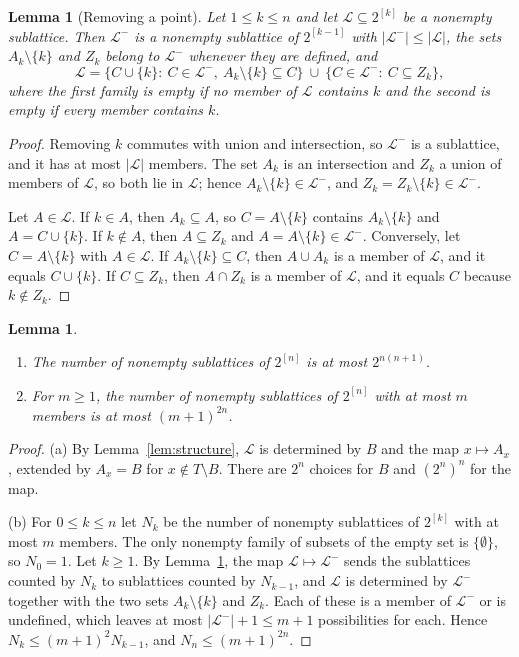 \documentclass[11pt,reqno]{amsart}
\numberwithin{equation}{section}
\theoremstyle{plain}
\newtheorem{lemma}[theorem]{Lemma}
\theoremstyle{definition}
\theoremstyle{remark}
\newcommand{\cL}{\mathcal{L}}
\begin{document}
\begin{lemma}[Removing a point]
\label{lem:remove}
Let $1\le k\le n$ and let $\cL\subseteq2^{[k]}$ be a nonempty
sublattice. Then $\cL^{-}$ is a nonempty sublattice of $2^{[k-1]}$ with
$|\cL^{-}|\le|\cL|$, the sets $A_k\setminus\{k\}$ and $Z_k$ belong to
$\cL^{-}$ whenever they are defined, and
\[
\cL=\bigl\{C\cup\{k\}:\ C\in\cL^{-},\ A_k\setminus\{k\}\subseteq C\bigr\}
\ \cup\ \bigl\{C\in\cL^{-}:\ C\subseteq Z_k\bigr\},
\]
where the first family is empty if no member of $\cL$ contains $k$ and
the second is empty if every member contains $k$.
\end{lemma}

\begin{proof}
Removing $k$ commutes with union and intersection, so $\cL^{-}$ is a
sublattice, and it has at most $|\cL|$ members. The set $A_k$ is an
intersection and $Z_k$ a union of members of $\cL$, so both lie in
$\cL$; hence $A_k\setminus\{k\}\in\cL^{-}$, and $Z_k=Z_k\setminus\{k\}
\in\cL^{-}$.

Let $A\in\cL$. If $k\in A$, then $A_k\subseteq A$, so
$C=A\setminus\{k\}$ contains $A_k\setminus\{k\}$ and $A=C\cup\{k\}$. If
$k\notin A$, then $A\subseteq Z_k$ and $A=A\setminus\{k\}\in\cL^{-}$.
Conversely, let $C=A\setminus\{k\}$ with $A\in\cL$. If
$A_k\setminus\{k\}\subseteq C$, then $A\cup A_k$ is a member of $\cL$, and
it equals $C\cup\{k\}$. If $C\subseteq Z_k$, then $A\cap Z_k$ is a member
of $\cL$, and it equals $C$ because $k\notin Z_k$.
\end{proof}

\begin{lemma}
\label{lem:count}
\begin{enumerate}[label=\textup{(\alph*)},leftmargin=2em]
\item The number of nonempty sublattices of $2^{[n]}$ is at most
$2^{n(n+1)}$.
\item For $m\ge1$, the number of nonempty sublattices of $2^{[n]}$ with at
most $m$ members is at most $(m+1)^{2n}$.
\end{enumerate}
\end{lemma}

\begin{proof}
(a) By Lemma~\ref{lem:structure}, $\cL$ is determined by $B$ and the
map $x\mapsto A_x$, extended by $A_x=B$ for $x\notin T\setminus B$. There
are $2^{n}$ choices for $B$ and $(2^{n})^{n}$ for the map.

(b) For $0\le k\le n$ let $N_k$ be the number of nonempty sublattices of
$2^{[k]}$ with at most $m$ members. The only nonempty family of subsets
of the empty set is $\{\emptyset\}$, so $N_0=1$. Let $k\ge1$. By
Lemma~\ref{lem:remove}, the map $\cL\mapsto\cL^{-}$ sends the
sublattices counted by $N_k$ to sublattices counted by $N_{k-1}$, and
$\cL$ is determined by $\cL^{-}$ together with the two sets
$A_k\setminus\{k\}$ and $Z_k$. Each of these is a member of $\cL^{-}$ or
is undefined, which leaves at most $|\cL^{-}|+1\le m+1$ possibilities for
each. Hence $N_k\le(m+1)^{2}N_{k-1}$, and $N_n\le(m+1)^{2n}$.
\end{proof}
\end{document}
